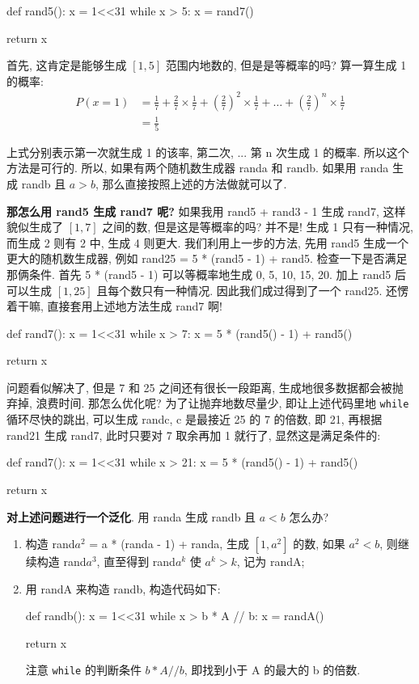 \begin{python}
	def rand5():
		x = 1<<31
		while x > 5:
			x = rand7()
		
		return x
\end{python}

首先, 这肯定是能够生成 $[1, 5]$ 范围内地数的, 但是是等概率的吗? 算一算生成 1 的概率:
$$
\begin{aligned}
	P(x=1) &= \frac{1}{7} + \frac{2}{7} \times \frac{1}{7 } + (\frac{2}{7})^2 \times \frac{1}{7} + \dots + (\frac{2}{7})^n \times \frac{1}{7} \\
		   &= \frac{1}{5}
\end{aligned}
$$

上式分别表示第一次就生成 1 的该率, 第二次, ... 第 n 次生成 1 的概率. 所以这个方法是可行的. 所以, 如果有两个随机数生成器 randa 和 randb. 如果用 randa 生成 randb 且 $a > b$, 那么直接按照上述的方法做就可以了.

\textbf{那怎么用 rand5 生成 rand7 呢?}
如果我用 rand5 + rand3 - 1 生成 rand7, 这样貌似生成了 $[1, 7]$ 之间的数, 但是这是等概率的吗? 并不是! 生成 1 只有一种情况, 而生成 2 则有 2 中, 生成 4 则更大. 我们利用上一步的方法, 先用 rand5 生成一个更大的随机数生成器, 例如 rand25 = 5 * (rand5 - 1) + rand5. 检查一下是否满足那俩条件. 首先 5 * (rand5 - 1) 可以等概率地生成 0, 5, 10, 15, 20. 加上 rand5 后可以生成 $[1, 25]$ 且每个数只有一种情况. 因此我们成过得到了一个 rand25. 还愣着干嘛, 直接套用上述地方法生成 rand7 啊!

\begin{python}
	def rand7():
		x = 1<<31
		while x > 7:
			x = 5 * (rand5() - 1) + rand5()
	
	return x
\end{python}

问题看似解决了, 但是 7 和 25 之间还有很长一段距离, 生成地很多数据都会被抛弃掉, 浪费时间. 那怎么优化呢? 为了让抛弃地数尽量少, 即让上述代码里地 \texttt{while} 循环尽快的跳出, 可以生成 randc, c 是最接近 25 的 7 的倍数, 即 21, 再根据 rand21 生成 rand7, 此时只要对 7 取余再加 1 就行了, 显然这是满足条件的:

\begin{python}
	def rand7():
		x = 1<<31
		while x > 21:
			x = 5 * (rand5() - 1) + rand5()
	
	return x %
\end{python}

\textbf{对上述问题进行一个泛化}. 用 randa 生成 randb 且 $a < b$ 怎么办?
\begin{enumerate}
	\item 构造 rand$a^2$ = a * (randa - 1) + randa, 生成 $[1, a^2]$ 的数, 如果 $a^2 < b$, 则继续构造 rand$a^3$, 直至得到 rand$a^k$ 使 $a^k > k$, 记为 randA;
	
	\item 用 randA 来构造 randb, 构造代码如下:
	  \begin{python}
	  	def randb():
		  	x = 1<<31
		  	while x > b * A // b:
		  		x = randA()
	  	
	  	return x %
	  \end{python}
  	注意 \texttt{while} 的判断条件 $b * A // b$, 即找到小于 A 的最大的 b 的倍数.
\end{enumerate}

